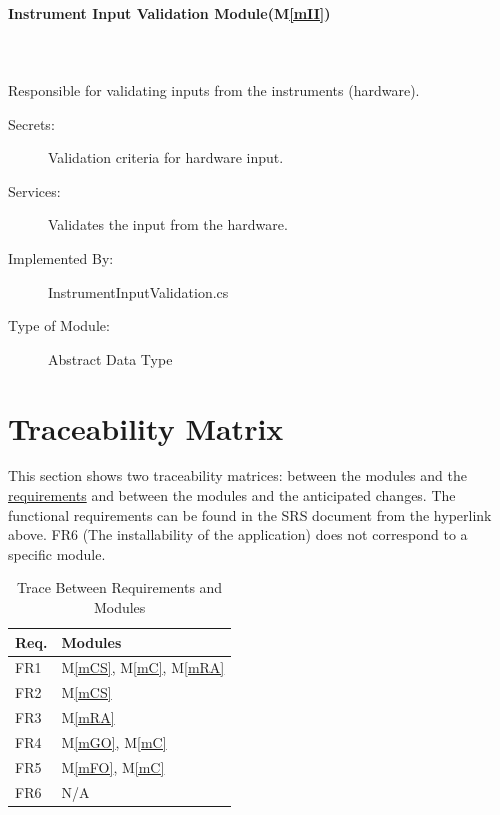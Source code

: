 \documentclass[12pt, titlepage]{article}
\newcommand{\mref}[1]{M\ref{#1}}
\begin{document}
\paragraph{Instrument Input Validation Module(\mref{mII})}
\\~\\
Responsible for validating inputs from the instruments (hardware).
\begin{description}
  \item[Secrets:] Validation criteria for hardware input.
  \item[Services:] Validates the input from the hardware.
  \item[Implemented By:] InstrumentInputValidation.cs 
  \item[Type of Module:] Abstract Data Type
\end{description}

\section{Traceability Matrix} \label{SecTM}

This section shows two traceability matrices: between the modules and the \href{https://github.com/edwin-do/capstoneTeam30/blob/main/docs/SRS/SRS.pdf}{requirements} and between the modules and the anticipated changes. The functional requirements can be found in the SRS document from the hyperlink above. FR6 (The installability of the application) does not correspond to a specific module.

\begin{table}[H]
\centering
\begin{tabular}{p{} p{}}
\toprule
\textbf{Req.} & \textbf{Modules}\\
\midrule
FR1 & \mref{mCS}, \mref{mC}, \mref{mRA}   \\
FR2 & \mref{mCS} \\
FR3 & \mref{mRA} \\
FR4 & \mref{mGO}, \mref{mC}\\
FR5 & \mref{mFO}, \mref{mC}\\
FR6 &  N/A \\
\bottomrule
\end{tabular}
\caption{Trace Between Requirements and Modules}
\label{TblRT}
\end{table}
\end{document}
